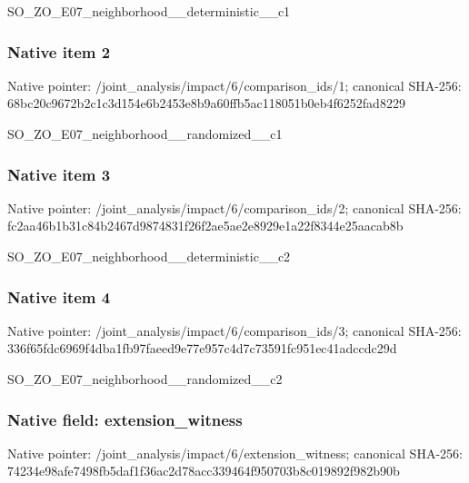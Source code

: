 \documentclass[10pt,a4paper]{article}
\begin{document}
\begingroup\raggedright\sloppy SO\_\allowbreak{}ZO\_\allowbreak{}E07\_\allowbreak{}neighborhood\_\allowbreak{}\_\allowbreak{}deterministic\_\allowbreak{}\_\allowbreak{}c1\par\endgroup

\subsubsection{Native item 2}
Native pointer: /joint\_\allowbreak{}analysis/impact/6/comparison\_\allowbreak{}ids/1; canonical SHA-256: 68bc20c9672b2c1c3d154e6b2453e8b9a60ffb5ac118051b0eb4f6252fad8229

\begingroup\raggedright\sloppy SO\_\allowbreak{}ZO\_\allowbreak{}E07\_\allowbreak{}neighborhood\_\allowbreak{}\_\allowbreak{}randomized\_\allowbreak{}\_\allowbreak{}c1\par\endgroup

\subsubsection{Native item 3}
Native pointer: /joint\_\allowbreak{}analysis/impact/6/comparison\_\allowbreak{}ids/2; canonical SHA-256: fc2aa46b1b31c84b2467d9874831f26f2ae5ae2e8929e1a22f8344e25aacab8b

\begingroup\raggedright\sloppy SO\_\allowbreak{}ZO\_\allowbreak{}E07\_\allowbreak{}neighborhood\_\allowbreak{}\_\allowbreak{}deterministic\_\allowbreak{}\_\allowbreak{}c2\par\endgroup

\subsubsection{Native item 4}
Native pointer: /joint\_\allowbreak{}analysis/impact/6/comparison\_\allowbreak{}ids/3; canonical SHA-256: 336f65fdc6969f4dba1fb97faeed9e77e957c4d7c73591fc951ec41adccdc29d

\begingroup\raggedright\sloppy SO\_\allowbreak{}ZO\_\allowbreak{}E07\_\allowbreak{}neighborhood\_\allowbreak{}\_\allowbreak{}randomized\_\allowbreak{}\_\allowbreak{}c2\par\endgroup

\subsubsection{Native field: extension\_\allowbreak{}witness}
Native pointer: /joint\_\allowbreak{}analysis/impact/6/extension\_\allowbreak{}witness; canonical SHA-256: 74234e98afe7498fb5daf1f36ac2d78acc339464f950703b8c019892f982b90b
\end{document}
